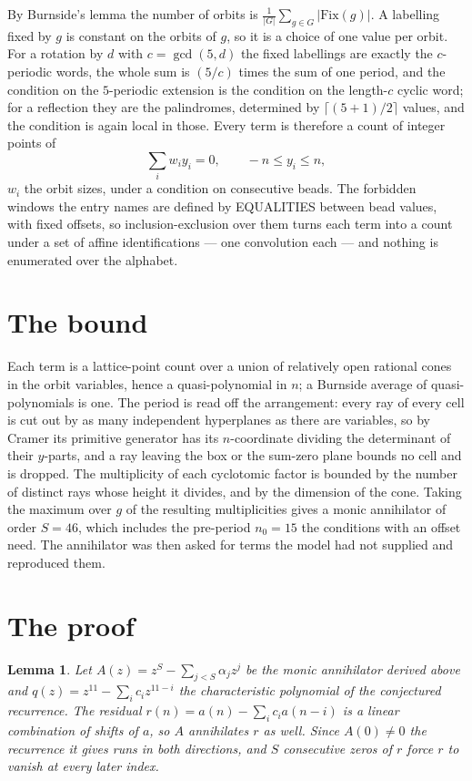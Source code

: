 \documentclass[11pt,a4paper]{article}
\theoremstyle{plain}
\newtheorem{lemma}[theorem]{Lemma}
\theoremstyle{definition}
\begin{document}
By Burnside's lemma the number of orbits is $\frac{1}{|G|}\sum_{g\in G}|\mathrm{Fix}(g)|$.
A labelling fixed by $g$ is constant on the orbits of $g$, so it is a choice of one value per
orbit. For a rotation by $d$ with $c=\gcd(5,d)$ the fixed labellings are exactly the
$c$-periodic words, the whole sum is $(5/c)$ times the sum of one period, and the condition on
the $5$-periodic extension is the condition on the length-$c$ cyclic word; for a reflection
they are the palindromes, determined by $\lceil(5+1)/2\rceil$ values, and the condition is
again local in those. Every term is therefore a count of integer points of
\[
\sum_i w_i y_i = 0, \qquad -n \le y_i \le n,
\]
$w_i$ the orbit sizes, under a condition on consecutive beads. The forbidden windows the entry
names are defined by EQUALITIES between bead values, with fixed offsets, so inclusion-exclusion
over them turns each term into a count under a set of affine identifications --- one
convolution each --- and nothing is enumerated over the alphabet.

\section{The bound}

Each term is a lattice-point count over a union of relatively open rational cones in the orbit
variables, hence a quasi-polynomial in $n$; a Burnside average of quasi-polynomials is one. The
period is read off the arrangement: every ray of every cell is cut out by as many independent
hyperplanes as there are variables, so by Cramer its primitive generator has its $n$-coordinate
dividing the determinant of their $y$-parts, and a ray leaving the box or the sum-zero plane
bounds no cell and is dropped. The multiplicity of each cyclotomic factor is bounded by the
number of distinct rays whose height it divides, and by the dimension of the cone. Taking the
maximum over $g$ of the resulting multiplicities gives a monic annihilator of order
$S=46$, which includes the pre-period $n_0=15$ the conditions with an offset need. The
annihilator was then asked for terms the model had not supplied and reproduced them.

\section{The proof}

\begin{lemma}\label{lem:crit}
Let $A(z)=z^S-\sum_{j<S}\alpha_jz^{j}$ be the monic annihilator derived above and
$q(z)=z^{11}-\sum_ic_iz^{11-i}$ the characteristic polynomial of the conjectured
recurrence. The residual $r(n)=a(n)-\sum_ic_ia(n-i)$ is a linear combination of shifts of $a$,
so $A$ annihilates $r$ as well. Since $A(0)\ne0$ the recurrence it gives runs in both
directions, and $S$ consecutive zeros of $r$ force $r$ to vanish at every later index.
\end{lemma}
\end{document}
